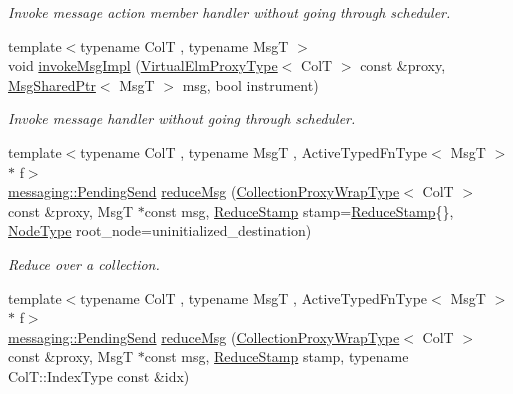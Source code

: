 \begin{DoxyCompactItemize}
\begin{DoxyCompactList}\small\item\em Invoke message action member handler without going through scheduler. \end{DoxyCompactList}\item 
{\footnotesize template$<$typename ColT , typename MsgT $>$ }\\void \hyperlink{structvt_1_1vrt_1_1collection_1_1_collection_manager_abaf663e12552109d1af87d8c9a82ce25}{invoke\+Msg\+Impl} (\hyperlink{namespacevt_1_1vrt_a620a5c8c59d13e513f690c74b4af516f}{Virtual\+Elm\+Proxy\+Type}$<$ ColT $>$ const \&proxy, \hyperlink{namespacevt_ab2b3d506ec8e8d1540aede826d84a239}{Msg\+Shared\+Ptr}$<$ MsgT $>$ msg, bool instrument)
\begin{DoxyCompactList}\small\item\em Invoke message handler without going through scheduler. \end{DoxyCompactList}\item 
{\footnotesize template$<$typename ColT , typename MsgT , Active\+Typed\+Fn\+Type$<$ Msg\+T $>$ $\ast$ f$>$ }\\\hyperlink{structvt_1_1messaging_1_1_pending_send}{messaging\+::\+Pending\+Send} \hyperlink{structvt_1_1vrt_1_1collection_1_1_collection_manager_a2ac056928e39edf125420e1113cde2bf}{reduce\+Msg} (\hyperlink{structvt_1_1vrt_1_1collection_1_1_collection_manager_a56458ed7f9bb22b631b9b3a745f42f94}{Collection\+Proxy\+Wrap\+Type}$<$ ColT $>$ const \&proxy, MsgT $\ast$const msg, \hyperlink{structvt_1_1vrt_1_1collection_1_1_collection_manager_ae8aac19e0ae07e9225142e5880eac830}{Reduce\+Stamp} stamp=\hyperlink{structvt_1_1vrt_1_1collection_1_1_collection_manager_ae8aac19e0ae07e9225142e5880eac830}{Reduce\+Stamp}\{\}, \hyperlink{namespacevt_a866da9d0efc19c0a1ce79e9e492f47e2}{Node\+Type} root\+\_\+node=uninitialized\+\_\+destination)
\begin{DoxyCompactList}\small\item\em Reduce over a collection. \end{DoxyCompactList}\item 
{\footnotesize template$<$typename ColT , typename MsgT , Active\+Typed\+Fn\+Type$<$ Msg\+T $>$ $\ast$ f$>$ }\\\hyperlink{structvt_1_1messaging_1_1_pending_send}{messaging\+::\+Pending\+Send} \hyperlink{structvt_1_1vrt_1_1collection_1_1_collection_manager_a47fe848e9c16d55bcefcbfeefa6b5597}{reduce\+Msg} (\hyperlink{structvt_1_1vrt_1_1collection_1_1_collection_manager_a56458ed7f9bb22b631b9b3a745f42f94}{Collection\+Proxy\+Wrap\+Type}$<$ ColT $>$ const \&proxy, MsgT $\ast$const msg, \hyperlink{structvt_1_1vrt_1_1collection_1_1_collection_manager_ae8aac19e0ae07e9225142e5880eac830}{Reduce\+Stamp} stamp, typename Col\+T\+::\+Index\+Type const \&idx)

\end{DoxyCompactItemize}
